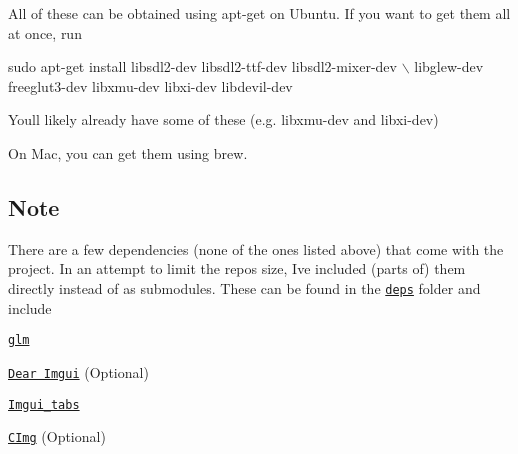 All of these can be obtained using {\ttfamily apt-\/get} on Ubuntu. If you want to get them all at once, run


\begin{DoxyCode}
sudo apt-get install libsdl2-dev libsdl2-ttf-dev libsdl2-mixer-dev \(\backslash\)
    libglew-dev freeglut3-dev libxmu-dev libxi-dev libdevil-dev
\end{DoxyCode}
 You\textquotesingle{}ll likely already have some of these (e.\+g. libxmu-\/dev and libxi-\/dev)

On Mac, you can get them using {\ttfamily brew}.

\subsection*{Note}

There are a few dependencies (none of the ones listed above) that come with the project. In an attempt to limit the repo\textquotesingle{}s size, I\textquotesingle{}ve included (parts of) them directly instead of as submodules. These can be found in the \href{https://github.com/NivenT/jubilant-funicular/tree/master/deps}{\tt deps} folder and include


\begin{DoxyItemize}
\item \href{https://glm.g-truc.net/0.9.8/index.html}{\tt glm}
\item \href{https://github.com/ocornut/imgui}{\tt Dear Imgui} (Optional)
\begin{DoxyItemize}
\item \href{https://github.com/ebachard/imgui_tabs}{\tt Imgui\+\_\+tabs}
\end{DoxyItemize}
\item \href{https://github.com/dtschump/CImg}{\tt C\+Img} (Optional) 
\end{DoxyItemize}